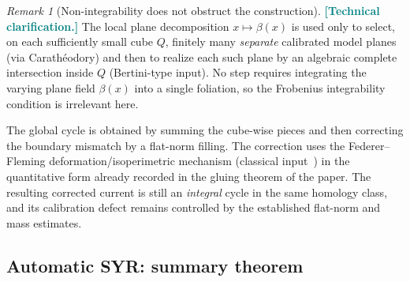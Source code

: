 \documentclass[11pt]{article}
\newcommand{\REVMZ}[1]{\textcolor{teal}{#1}}  %
\numberwithin{equation}{section}  %
\theoremstyle{plain}
\theoremstyle{definition}
\theoremstyle{remark}
\newtheorem{remark}[theorem]{Remark}
\begin{document}
\begin{remark}[Non-integrability does not obstruct the construction]\label{rem:gluing}
\REVMZ{\textbf{[Technical clarification.]}}
The local plane decomposition $x\mapsto\beta(x)$ is used only to select, on each sufficiently small cube
$Q$, finitely many \emph{separate} calibrated model planes (via Carath\'eodory) and then to realize each
such plane by an algebraic complete intersection inside $Q$ (Bertini-type input).
No step requires integrating the varying plane field $\beta(x)$ into a single foliation, so the Frobenius
integrability condition is irrelevant here.

The global cycle is obtained by summing the cube-wise pieces and then correcting the boundary mismatch by a
flat-norm filling.  The correction uses the Federer--Fleming deformation/isoperimetric mechanism (classical
input~\cite{FF60}) in the quantitative form already recorded in the gluing theorem of the paper.
The resulting corrected current is still an \emph{integral} cycle in the same homology class, and its
calibration defect remains controlled by the established flat-norm and mass estimates.
\end{remark}


\subsection*{Automatic SYR: summary theorem}
\end{document}
